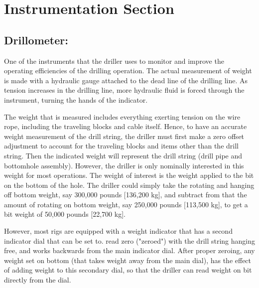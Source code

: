 \chapter{Instrumentation Section}


\section*{Drillometer:} 

One of the instruments that the driller uses to monitor
and improve the operating efficiencies of the drilling operation. The
actual measurement of weight is made with a hydraulic gauge
attached to the dead line of the drilling line. As tension increases in
the drilling line, more hydraulic fluid is forced through the
instrument, turning the hands of the indicator. 

\vspace{1em}

The weight that is measured includes everything exerting tension on the wire rope,
including the traveling blocks and cable itself. Hence, to have an
accurate weight measurement of the drill string, the driller must first
make a zero offset adjustment to account for the traveling blocks and
items other than the drill string. Then the indicated weight will
represent the drill string (drill pipe and bottomhole assembly).
However, the driller is only nominally interested in this weight for
most operations. The weight of interest is the weight applied to the
bit on the bottom of the hole. The driller could simply take the
rotating and hanging off bottom weight, say 300,000 pounds
[136,200 kg], and subtract from that the amount of rotating on bottom
weight, say 250,000 pounds [113,500 kg], to get a bit weight of
50,000 pounds [22,700 kg].

\vspace*{1em}

 However, most rigs are equipped with a
weight indicator that has a second indicator dial that can be set to.
read zero ("zeroed") with the drill string hanging free, and works
backwards from the main indicator dial. After proper zeroing, any
weight set on bottom (that takes weight away from the main dial), has
the effect of adding weight to this secondary dial, so that the driller
can read weight on bit directly from the dial.